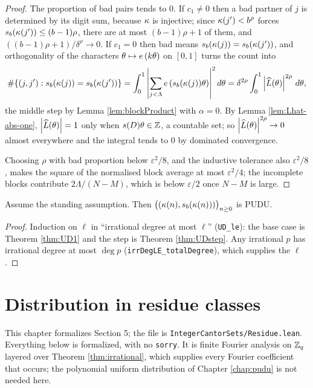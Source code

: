 \begin{proof}
  The proportion of bad pairs tends to $0$. If $c_1 \neq 0$ then a bad partner
  of $j$ is determined by its digit sum, because $\kappa$ is injective; since
  $\kappa(j') < b^\rho$ forces $s_b(\kappa(j')) \leq (b-1)\rho$, there are at
  most $(b-1)\rho + 1$ of them, and $((b-1)\rho+1)/\delta^\rho \to 0$. If
  $c_1 = 0$ then bad means $s_b(\kappa(j)) = s_b(\kappa(j'))$, and
  orthogonality of the characters $\theta \mapsto e\left(k\theta\right)$ on $[0,1]$
  turns the count into
  \[
    \#\{(j,j') : s_b(\kappa(j)) = s_b(\kappa(j'))\}
      = \int_0^1 \left\lvert \sum_{j<\Lambda} e\left(s_b(\kappa(j))\theta\right) \right\rvert^2 d\theta
      = \delta^{2\rho}\int_0^1 \left\lvert \widehat{L}(\theta) \right\rvert^{2\rho}\,d\theta ,
  \]
  the middle step by Lemma \ref{lem:blockProduct} with $\alpha = 0$. By Lemma
  \ref{lem:Lhat-abs-one}, $\left\lvert \widehat{L}(\theta) \right\rvert = 1$ only when
  $s(D)\theta \in \mathbb{Z}$, a countable set; so $\left\lvert \widehat{L}(\theta) \right\rvert^{2\rho} \to 0$
  almost everywhere and the integral tends to $0$ by dominated convergence.

  Choosing $\rho$ with bad proportion below $\varepsilon^2/8$, and the
  inductive tolerance also $\varepsilon^2/8$, makes the square of the
  normalised block average at most $\varepsilon^2/4$; the incomplete blocks
  contribute $2\Lambda/(N-M)$, which is below $\varepsilon/2$ once $N-M$ is
  large.
\end{proof}

\begin{theorem}[Theorem 4.3]
  \label{thm:polyUniform}
  \leanok
  Assume the standing assumption. Then
  $\bigl((\kappa(n), s_b(\kappa(n)))\bigr)_{n \geq 0}$ is PUDU.
\end{theorem}
\begin{proof}
  \leanok
  Induction on $\ell$ in ``irrational degree at most $\ell$''
  (\texttt{UD\_le}): the base case is Theorem \ref{thm:UD1} and the step is
  Theorem \ref{thm:UDstep}. Any irrational $p$ has irrational degree at most
  $\deg p$ (\texttt{irrDegLE\_totalDegree}), which supplies the $\ell$.
\end{proof}

\chapter{Distribution in residue classes}
\label{chap:residue}

This chapter formalizes Section 5; the file is
\texttt{IntegerCantorSets/Residue.lean}. Everything below is formalized, with
no \texttt{sorry}. It is finite Fourier analysis on $\mathbb{Z}_q$ layered over
Theorem \ref{thm:irrational}, which supplies every Fourier coefficient that
occurs; the polynomial uniform distribution of Chapter \ref{chap:pudu} is not
needed here.

